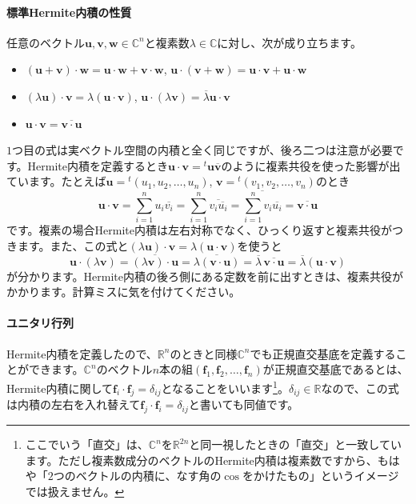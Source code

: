 \paragraph{標準Hermite内積の性質}

任意のベクトル$\bm{u}, \bm{v}, \bm{w} \in \mathbb{C}^n$と複素数$\lambda \in \mathbb{C}$に対し、次が成り立ちます。
\begin{itemize}
\item $(\bm{u} + \bm{v}) \cdot \bm{w} = \bm{u} \cdot \bm{w} + \bm{v} \cdot \bm{w}$, $\bm{u} \cdot (\bm{v} + \bm{w}) = \bm{u} \cdot \bm{v} + \bm{u} \cdot \bm{w}$
\item $(\lambda\bm{u}) \cdot \bm{v} = \lambda(\bm{u} \cdot \bm{v})$, $\bm{u} \cdot (\lambda \bm{v}) = \overline{\lambda} \bm{u} \cdot \bm{v}$
\item $\bm{u} \cdot \bm{v} = \overline{\bm{v} \cdot \bm{u}}$
\end{itemize}

$1$つ目の式は実ベクトル空間の内積と全く同じですが、後ろ二つは注意が必要です。Hermite内積を定義するとき$\bm{u} \cdot \bm{v} = {}^t \bm{u} \overline{\bm{v}}$のように複素共役を使った影響が出ています。たとえば$\bm{u} = {}^t(u_1, u_2, \ldots, u_n)$, $\bm{v} = {}^t(v_1, v_2, \ldots, v_n)$のとき
\[
\bm{u} \cdot \bm{v}
= \sum_{i = 1}^{n} u_i \overline{v_i}
= \sum_{i = 1}^{n} \overline{v_i \overline{u_i}}
= \overline{\sum_{i = 1}^{n} v_i \overline{u_i}}
= \overline{\bm{v} \cdot \bm{u}}
\]
です。複素の場合Hermite内積は左右対称でなく、ひっくり返すと複素共役がつきます。また、この式と$(\lambda\bm{u}) \cdot \bm{v} = \lambda (\bm{u} \cdot \bm{v})$を使うと
\[
\bm{u} \cdot (\lambda\bm{v}) = \overline{(\lambda \bm{v}) \cdot \bm{u}} = \overline{\lambda (\bm{v} \cdot \bm{u})} = \overline{\lambda} \, \overline{\bm{v} \cdot \bm{u}} = \overline{\lambda} (\bm{u} \cdot \bm{v})
\]
が分かります。Hermite内積の後ろ側にある定数を前に出すときは、複素共役がかかります。計算ミスに気を付けてください。

\paragraph{ユニタリ行列}

Hermite内積を定義したので、$\mathbb{R}^n$のときと同様$\mathbb{C}^n$でも正規直交基底を定義することができます。$\mathbb{C}^n$のベクトル$n$本の組$(\bm{f}_1, \bm{f}_2, \ldots, \bm{f}_n)$が正規直交基底であるとは、Hermite内積に関して$\bm{f}_i \cdot \bm{f}_j = \delta_{ij}$となることをいいます\footnote{ここでいう「直交」は、$\mathbb{C}^n$を$\mathbb{R}^{2n}$と同一視したときの「直交」と一致しています。ただし複素数成分のベクトルのHermite内積は複素数ですから、もはや「$2$つのベクトルの内積に、なす角の$\cos$をかけたもの」というイメージでは扱えません。}。$\delta_{ij} \in \mathbb{R}$なので、この式は内積の左右を入れ替えて$\bm{f}_j \cdot \bm{f}_i = \delta_{ij}$と書いても同値です。

